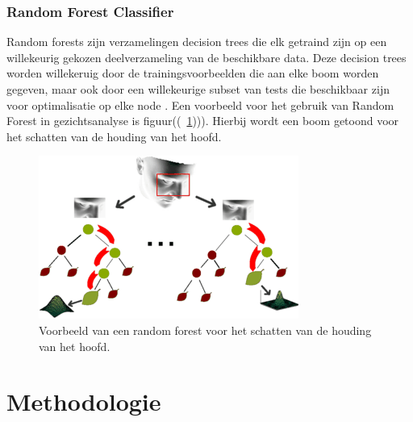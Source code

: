 \subsubsection{Random Forest Classifier}
\label{subsub:randomforest}
Random forests zijn verzamelingen decision trees die elk getraind zijn op een willekeurig gekozen deelverzameling van de beschikbare data. Deze decision trees worden willekeruig door de trainingsvoorbeelden die aan elke boom worden gegeven,  maar ook door een willekeurige subset van tests die beschikbaar zijn voor optimalisatie op elke node \autocite{Fanelli2012}. 
Een voorbeeld voor het gebruik van Random Forest in gezichtsanalyse is figuur((~\ref{fig:randomforest}))). Hierbij wordt een boom getoond voor het  schatten van de houding van het hoofd. 
\begin{figure}
    \centering
    \includegraphics[width=\columnwidth]{graphics/headposition.png}
    \caption{\label{fig:randomforest}Voorbeeld van een random forest voor het schatten van de houding van het hoofd\autocite{Fanelli2012}.}
\end{figure}



\section{Methodologie}%
\label{sec:methodologie}

